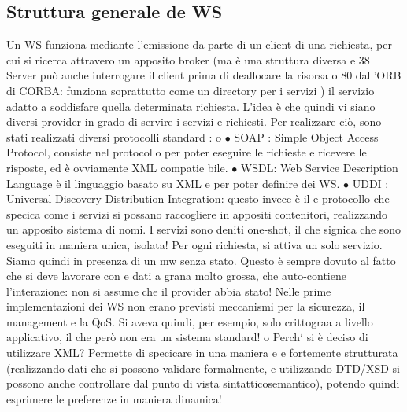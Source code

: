 \documentclass[a4paper,12pt]{article}
\begin{document}
\subsection{Struttura generale de WS}
Un WS funziona mediante l'emissione da parte di un client di una richiesta,
per cui si ricerca attravero un apposito broker (ma è una struttura diversa
e
38 Server
può anche interrogare il client prima di deallocare la risorsa
o
80
dall'ORB di CORBA: funziona soprattutto come un directory per i servizi ) il
servizio adatto a soddisfare quella determinata richiesta.
L'idea è che quindi vi siano diversi provider in grado di servire i servizi
e
richiesti. Per realizzare ciò, sono stati realizzati diversi protocolli standard :
o
$\bullet$ SOAP : Simple Object Access Protocol, consiste nel protocollo per poter
eseguire le richieste e ricevere le risposte, ed è ovviamente XML compatie
bile.
$\bullet$ WSDL: Web Service Description Language è il linguaggio basato su XML
e
per poter definire dei WS.
$\bullet$ UDDI : Universal Discovery Distribution Integration: questo invece è il
e
protocollo che specica come i servizi si possano raccogliere in appositi
contenitori, realizzando un apposito sistema di nomi.
I servizi sono deniti one-shot, il che signica che sono eseguiti in maniera unica,
isolata! Per ogni richiesta, si attiva un solo servizio. Siamo quindi in presenza
di un mw senza stato. Questo è sempre dovuto al fatto che si deve lavorare con
e
dati a grana molto grossa, che auto-contiene l'interazione: non si assume che il
provider abbia stato!
Nelle prime implementazioni dei WS non erano previsti meccanismi per la
sicurezza, il management e la QoS. Si aveva quindi, per esempio, solo crittograa
a livello applicativo, il che però non era un sistema standard!
o
Perch` si è deciso di utilizzare XML? Permette di specicare in una maniera
e e
fortemente strutturata (realizzando dati che si possono validare formalmente, e
utilizzando DTD/XSD si possono anche controllare dal punto di vista sintatticosemantico), potendo quindi esprimere le
preferenze in maniera dinamica!
\end{document}
